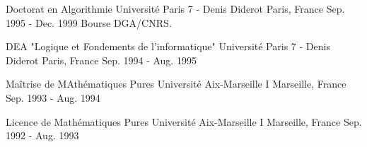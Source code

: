 

\begin{cventries}

  \cventry
    {Doctorat en Algorithmie} %
    {Université Paris 7 - Denis Diderot} %
    {Paris, France} %
    {Sep. 1995 - Dec. 1999} %
    {Bourse DGA/CNRS.}
    {}

  \cventrysimple
    {DEA "Logique et Fondements de l'informatique"} %
    {Université Paris 7 - Denis Diderot} %
    {Paris, France} %
    {Sep. 1994 - Aug. 1995} %

  \cventrysimple
    {Maîtrise de MAthématiques Pures} %
    {Université Aix-Marseille I} %
    {Marseille, France} %
    {Sep. 1993 - Aug. 1994} %

  \cventrysimple
    {Licence de Mathématiques Pures} %
    {Université Aix-Marseille I} %
    {Marseille, France} %
    {Sep. 1992 - Aug. 1993} %

\end{cventries}
